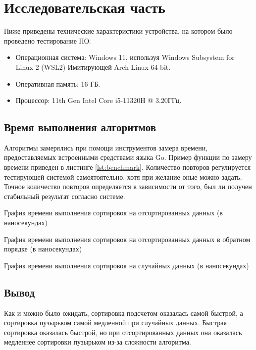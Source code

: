 \chapter{Исследовательская часть}
Ниже приведены технические характеристики устройства, на котором было проведено тестирование ПО:

\begin{itemize}
    \item Операционная система: Windows 11, используя Windows Subsystem for Linux 2 (WSL2)\cite{wsl2} Имитирующей Arch Linux\cite{arch} 64-bit.
    \item Оперативная память: 16 ГБ.
    \item Процессор: 11th Gen Intel\textsuperscript{\tiny\textregistered} Core\textsuperscript{\tiny\texttrademark} i5-11320H @ 3.20ГГц\cite{i5}.
\end{itemize}

\section{Время выполнения алгоритмов}
Алгоритмы замерялись при помощи инструментов замера времени, предоставляемых встроенными средствами языка Go\cite{go}.
Пример функции по замеру времени приведен в листинге \ref{lst:benchmark}.
Количество повторов регулируется тестирующей системой самоятоятельно, хотя при желание оные можно задать.
Точное количество повторов определяется в зависимости от того, был ли получен стабильный результат согласно системе.



График времени выполнения сортировок на отсортированных данных (в наносекундах)\newline
%

График времени выполнения сортировок на отсортированных данных в обратном порядке (в наносекундах)\newline
%

\newpage
График времени выполнения сортировок на случайных данных (в наносекундах)\newline

\section*{Вывод}

Как и можно было ожидать, сортировка подсчетом оказалась самой быстрой, а сортировка пузырьком самой медленной при случайных данных.
Быстрая сортировка оказалась быстрой, но при отсортированных данных она оказалась медленнее сортировки пузырьком из-за сложности алгоритма.
